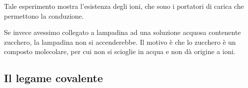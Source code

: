 Tale esperimento mostra l'esistenza degli ioni, che sono i portatori di carica che permettono la conduzione.

Se invece avessimo collegato a lampadina ad una soluzione acquosa contenente zucchero, la lampadina non si accenderebbe. Il motivo è che lo zucchero è un composto molecolare, per cui non si scioglie in acqua e non dà origine a ioni.
\subsection{Il legame covalente}
